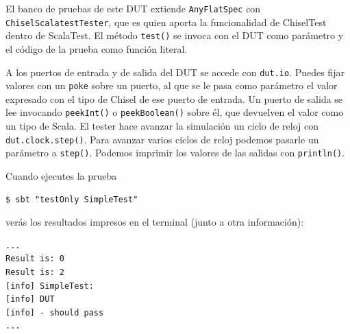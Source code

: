\documentclass[%
    10pt,
    headinclude, footinclude=false,
    openright, %
    notitlepage,
    cleardoublepage=empty,
    headsepline,
    numbers=noenddot,
    bibliography=totoc, index=totoc,
    ]{scrbook}
\newcommand{\code}[1]{{\lstinline[basicstyle=\small\ttfamily]{#1}}}
\begin{document}

El banco de pruebas de este DUT extiende \code{AnyFlatSpec} con \code{ChiselScalatestTester}, que es
quien aporta la funcionalidad de ChiselTest dentro de ScalaTest.
El método \code{test()} se invoca con el DUT como parámetro y el código de la prueba como función literal.




A los puertos de entrada y de salida del DUT se accede con \code{dut.io}.
Puedes fijar valores con un \code{poke} sobre un puerto, al que se le pasa como parámetro el valor
expresado con el tipo de Chisel de ese puerto de entrada.
Un puerto de salida se lee invocando \code{peekInt()} o \code{peekBoolean()} sobre él,
que devuelven el valor como un tipo de Scala.
El tester hace avanzar la simulación un ciclo de reloj con \code{dut.clock.step()}.
Para avanzar varios ciclos de reloj podemos pasarle un parámetro a
\code{step()}.
Podemos imprimir los valores de las salidas con \code{println()}.


Cuando ejecutes la prueba

\begin{verbatim}
$ sbt "testOnly SimpleTest"
\end{verbatim}


\noindent verás los resultados impresos en el terminal
(junto a otra información):

\begin{verbatim}
...
Result is: 0
Result is: 2
[info] SimpleTest:
[info] DUT
[info] - should pass
...
\end{verbatim}
\end{document}
